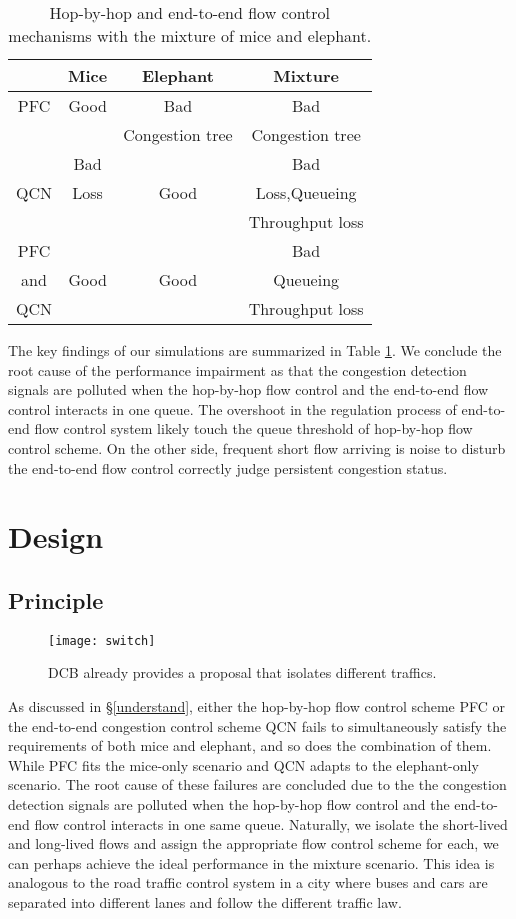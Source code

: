 \documentclass[]{sig-alternate-10pt}
\begin{document}
\begin{table}[!tp]
	\centering
	\begin{tabular}{|c|c|c|c|}
		\hline
		& Mice & Elephant  & Mixture  \\
		\hline
		PFC & Good & Bad & Bad \\
		& & Congestion tree & Congestion tree\\
		\hline
		 & Bad  &  & Bad\\
		QCN & Loss & Good & Loss,Queueing \\
		& & & Throughput loss \\
		\hline
		PFC &   &  & Bad \\
		and & Good & Good & Queueing \\
		QCN & & & Throughput loss \\
		\hline
	\end{tabular}
	\caption{Hop-by-hop and end-to-end flow control mechanisms with the mixture of mice and elephant.}
	\label{tab:dcb}
\end{table}
The key findings of our simulations are summarized in Table \ref{tab:dcb}.
We conclude the root cause of the performance impairment as that the congestion detection signals are polluted when the hop-by-hop flow control and the end-to-end flow control interacts in one queue.
The overshoot in the regulation process of end-to-end flow control system likely touch the queue threshold of hop-by-hop flow control scheme. On the other side, frequent short flow arriving is noise to disturb the end-to-end flow control correctly judge persistent congestion status.



 \section{Design}
\label{solution}
\subsection{Principle}
\label{principle}
\begin{figure}[t]
	\centering
	\texttt{[image: switch]}
	\caption{DCB  already provides a proposal that isolates different traffics.}
	\label{fig:dcb}
\end{figure}
As discussed in \S\ref{understand}, either the hop-by-hop flow control scheme PFC or the end-to-end congestion control scheme QCN fails to simultaneously satisfy the requirements of both mice and elephant, and so does the combination of them.
While PFC fits the mice-only scenario and QCN adapts to the elephant-only scenario.
The root cause of these failures are concluded due to the the congestion detection signals are polluted when the hop-by-hop flow control and the end-to-end flow control interacts in one same queue.
Naturally, we isolate the short-lived and long-lived flows and assign the appropriate flow control scheme for each, we can perhaps achieve the ideal performance in the mixture scenario.
This idea is analogous to the road traffic control system in a city where buses and cars are separated into different lanes and follow the different traffic law.
\end{document}
